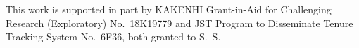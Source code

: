 \documentclass[twocolumn]{svjour3}
\begin{document}


\begin{acknowledgements}
This work is supported in part by KAKENHI Grant-in-Aid for Challenging Research (Exploratory) No.~18K19779 and JST Program to Disseminate Tenure Tracking System No.~6F36, both granted to S.~S.
\end{acknowledgements}




%
%
%
\end{document}
